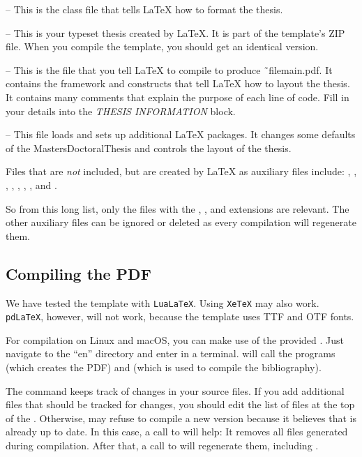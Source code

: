  -- This is the class file that tells LaTeX how to format the thesis.

 -- This is your typeset thesis created by LaTeX. It is part of the template's ZIP file. When you compile the template, you should get an identical version.

 -- This is the file that you tell LaTeX to compile to produce ˜file{main.pdf}. It contains the framework and constructs that tell LaTeX how to layout the thesis. It contains many comments that explain the purpose of each line of code. Fill in your details into the \emph{THESIS INFORMATION} block.

 -- This file loads and sets up additional LaTeX packages. It changes some defaults of the MastersDoctoralThesis and controls the layout of the thesis.

Files that are \emph{not} included, but are created by LaTeX as auxiliary files include: , , , , 
, , , and .

So from this long list, only the files with the , , and  extensions are relevant. The other auxiliary files can be ignored or deleted as every compilation will regenerate them.


\subsection{Compiling the PDF}

We have tested the template with \texttt{LuaLaTeX}. Using \texttt{XeTeX} may also work. \texttt{pdLaTeX}, however, will not work, because the template uses TTF and OTF fonts.

For compilation on Linux and macOS, you can make use of the provided . Just navigate to the ``en'' directory and enter  in a terminal.  will call the programs  (which creates the PDF) and  (which is used to compile the bibliography).

The  command keeps track of changes in your source files. If you add additional files that should be tracked for changes, you should edit the list of files at the top of the . Otherwise,  may refuse to compile a new version because it believes that  is already up to date. In this case, a call to  will help: It removes all files generated during compilation. After that, a call to  will regenerate them, including .


